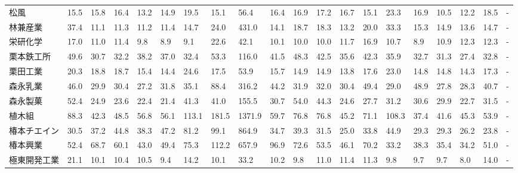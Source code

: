 \begin{longtable}[c]{lp{3mm}p{3mm}p{3mm}p{3mm}p{3mm}p{3mm}p{3mm}p{3mm}p{3mm}p{3mm}p{3mm}p{3mm}p{3mm}p{3mm}p{3mm}p{3mm}p{3mm}p{3mm}p{3mm}}
松風              &   15.5 &   15.8 &      16.4 &      13.2 &       14.9 &    19.5 &    15.1 &     56.4 &    16.4 &    16.9 &   17.2 &   16.7 &    15.1 &    23.3 &    16.9 &   10.5 &   12.2 &    18.5 &      - \\
林兼産業            &   37.4 &   11.1 &      11.3 &      11.2 &       11.4 &    14.7 &    24.0 &    431.0 &    14.1 &    18.7 &   18.3 &   13.2 &    20.0 &    33.3 &    15.3 &   14.9 &   13.6 &    14.7 &      - \\
栄研化学            &   17.0 &   11.0 &      11.4 &       9.8 &        8.9 &     9.1 &    22.6 &     42.1 &    10.1 &    10.0 &   10.0 &   11.7 &    16.9 &    10.7 &     8.9 &   10.9 &   12.3 &    12.3 &      - \\
栗本鉄工所           &   49.6 &   30.7 &      32.2 &      38.2 &       37.0 &    32.4 &    53.3 &    116.0 &    41.5 &    48.3 &   42.5 &   35.6 &    42.3 &    35.9 &    32.7 &   31.3 &   27.4 &    32.8 &      - \\
栗田工業            &   20.3 &   18.8 &      18.7 &      15.4 &       14.4 &    24.6 &    17.5 &     53.9 &    15.7 &    14.9 &   14.9 &   13.8 &    17.6 &    23.0 &    14.8 &   14.8 &   14.3 &    17.3 &      - \\
森永乳業            &   46.0 &   29.9 &      30.4 &      27.2 &       31.8 &    35.1 &    88.4 &    316.2 &    44.2 &    31.9 &   32.0 &   30.4 &    49.4 &    29.0 &    48.9 &   27.8 &   28.3 &    40.7 &      - \\
森永製菓            &   52.4 &   24.9 &      23.6 &      22.4 &       21.4 &    41.3 &    41.0 &    155.5 &    30.7 &    54.0 &   44.3 &   24.6 &    27.7 &    31.2 &    30.6 &   29.9 &   22.7 &    31.5 &      - \\
植木組             &   88.3 &   42.3 &      48.5 &      56.8 &       56.1 &   113.1 &   181.5 &   1371.9 &    59.7 &    76.8 &   76.8 &   45.2 &    71.1 &   108.3 &    37.4 &   41.6 &   45.3 &    53.9 &      - \\
椿本チエイン          &   30.5 &   37.2 &      44.8 &      38.3 &       47.2 &    81.2 &    99.1 &    864.9 &    34.7 &    39.3 &   31.5 &   25.0 &    33.8 &    44.9 &    29.3 &   29.3 &   26.2 &    23.8 &      - \\
椿本興業            &   52.4 &   68.7 &      60.1 &      43.0 &       49.4 &    75.3 &   112.2 &    657.9 &    96.9 &    72.6 &   53.5 &   46.1 &    70.2 &    33.2 &    38.3 &   35.4 &   34.2 &    51.0 &      - \\
極東開発工業          &   21.1 &   10.1 &      10.4 &      10.5 &        9.4 &    14.2 &    10.1 &     33.2 &    10.2 &     9.8 &   11.0 &   11.4 &    11.3 &     9.8 &     9.7 &    9.7 &    8.0 &    14.0 &      - \\

\end{longtable}
